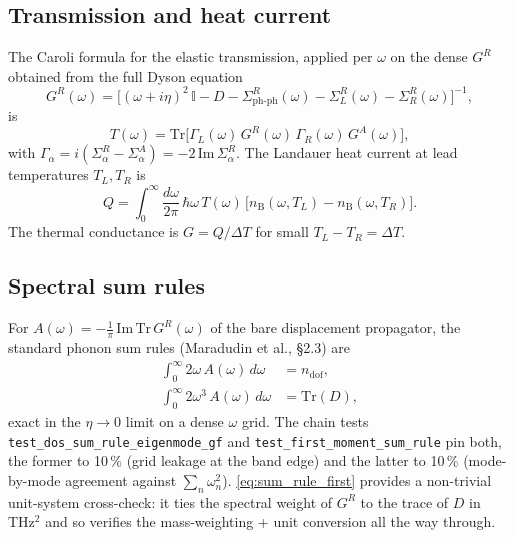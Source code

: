 \subsection{Transmission and heat current}
\label{ap:fa_obs_transport}

The Caroli formula for the elastic transmission, applied per
$\omega$ on the dense $G^R$ obtained from the full Dyson equation
\begin{equation}
  G^R(\omega) = \bigl[(\omega + i\eta)^2\,\mathbb{I} - D
    - \Sigma_{\mathrm{ph\text{-}ph}}^R(\omega)
    - \Sigma_L^R(\omega) - \Sigma_R^R(\omega)\bigr]^{-1},
\end{equation}
is
\begin{equation}
  T(\omega) = \mathrm{Tr}\bigl[\Gamma_L(\omega)\,G^R(\omega)\,\Gamma_R(\omega)\,G^A(\omega)\bigr],
\end{equation}
with $\Gamma_\alpha = i(\Sigma_\alpha^R - \Sigma_\alpha^A) = -2\,\mathrm{Im}\,\Sigma_\alpha^R$.
The Landauer heat current at lead temperatures $T_L, T_R$ is
\begin{equation}
  Q = \int_0^\infty \frac{d\omega}{2\pi}\,\hbar\omega\,T(\omega)\,
        \bigl[n_{\mathrm{B}}(\omega, T_L) - n_{\mathrm{B}}(\omega, T_R)\bigr].
\end{equation}
The thermal conductance is $G = Q / \Delta T$ for small $T_L - T_R = \Delta T$.

\subsection{Spectral sum rules}
\label{ap:fa_obs_sumrules}

For $A(\omega) = -\frac{1}{\pi}\,\mathrm{Im}\,\mathrm{Tr}\,G^R(\omega)$
of the bare displacement propagator, the standard phonon sum rules
(Maradudin et al., \S 2.3) are
\begin{align}
  \int_0^\infty 2\omega\,A(\omega)\,d\omega &= n_{\mathrm{dof}}, \label{eq:sum_rule_zero}\\
  \int_0^\infty 2\omega^3\,A(\omega)\,d\omega &= \mathrm{Tr}(D), \label{eq:sum_rule_first}
\end{align}
exact in the $\eta \to 0$ limit on a dense $\omega$ grid.  The chain
tests \texttt{test\_dos\_sum\_rule\_eigenmode\_gf} and
\texttt{test\_first\_moment\_sum\_rule} pin both, the former to 10\,\%
(grid leakage at the band edge) and the latter to 10\,\% (mode-by-mode
agreement against $\sum_n \omega_n^2$).  \cref{eq:sum_rule_first}
provides a non-trivial unit-system cross-check: it ties the spectral
weight of $G^R$ to the trace of $D$ in THz$^2$ and so verifies the
mass-weighting + unit conversion all the way through.

